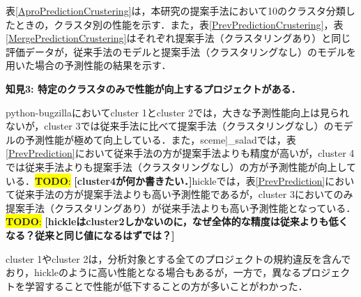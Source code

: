 \documentclass[T,J]{fose} %
\newcommand{\todo}[1]{\colorbox{yellow}{{\bf TODO}:}{\color{red} {\textbf{[#1]}}}}
\begin{document}
表\ref{AproPredictionCrustering}は，本研究の提案手法において10のクラスタ分類したときの，クラスタ別の性能を示す．また，表\ref{PrevPredictionCrustering}，表\ref{MergePredictionCrustering}はそれぞれ提案手法（クラスタリングあり）と同じ評価データが，従来手法のモデルと提案手法（クラスタリングなし）のモデルを用いた場合の予測性能の結果を示す．

\noindent\textbf{知見3: 特定のクラスタのみで性能が向上するプロジェクトがある．}

python-bugzillaにおいてcluster 1とcluster 2では，大きな予測性能向上は見られないが，cluster 3では従来手法に比べて提案手法（クラスタリングなし）のモデルの予測性能が極めて向上している．また，sceme|\_saladでは，表\ref{PrevPrediction}において従来手法の方が提案手法よりも精度が高いが，cluster 4では従来手法よりも提案手法（クラスタリングなし）の方が予測性能が向上している．\todo{cluster4が何か書きたい．}hickleでは，表\ref{PrevPrediction}において従来手法の方が提案手法よりも高い予測性能であるが，cluster 3においてのみ提案手法（クラスタリングあり）が従来手法よりも高い予測性能となっている．\todo{hickleはcluster2しかないのに，なぜ全体的な精度は従来よりも低くなる？従来と同じ値になるはずでは？}


cluster 1やcluster 2は，分析対象とする全てのプロジェクトの規約違反を含んでおり，hickleのように高い性能となる場合もあるが，一方で，異なるプロジェクトを学習することで性能が低下することの方が多いことがわかった．



 
\end{document}

